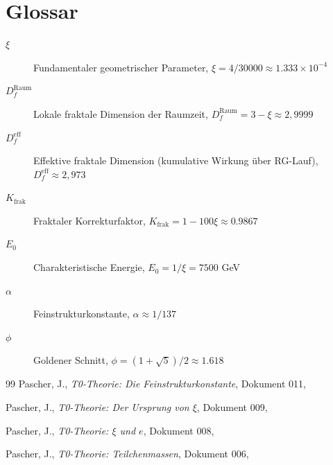 	\section{Glossar}
	
	\begin{description}
		\item[$\xi$] Fundamentaler geometrischer Parameter, $\xi = 4/30000 \approx 1.333 \times 10^{-4}$
		\item[$D_f^{\text{Raum}}$] Lokale fraktale Dimension der Raumzeit, $D_f^{\text{Raum}} = 3 - \xi \approx 2{,}9999$
		\item[$D_f^{\text{eff}}$] Effektive fraktale Dimension (kumulative Wirkung über RG-Lauf), $D_f^{\text{eff}} \approx 2{,}973$
		\item[$K_{\text{frak}}$] Fraktaler Korrekturfaktor, $K_{\text{frak}} = 1 - 100\xi \approx 0.9867$
		\item[$E_0$] Charakteristische Energie, $E_0 = 1/\xi = 7500$ GeV
		\item[$\alpha$] Feinstrukturkonstante, $\alpha \approx 1/137$
		\item[$\phi$] Goldener Schnitt, $\phi = (1+\sqrt{5})/2 \approx 1.618$
	\end{description}
	

	
	\begin{thebibliography}{99}
		Pascher, J., \emph{T0-Theorie: Die Feinstrukturkonstante}, Dokument 011, 

		Pascher, J., \emph{T0-Theorie: Der Ursprung von $\xi$}, Dokument 009,

		Pascher, J., \emph{T0-Theorie: $\xi$ und $e$}, Dokument 008,

		Pascher, J., \emph{T0-Theorie: Teilchenmassen}, Dokument 006,
		
	\end{thebibliography}
	